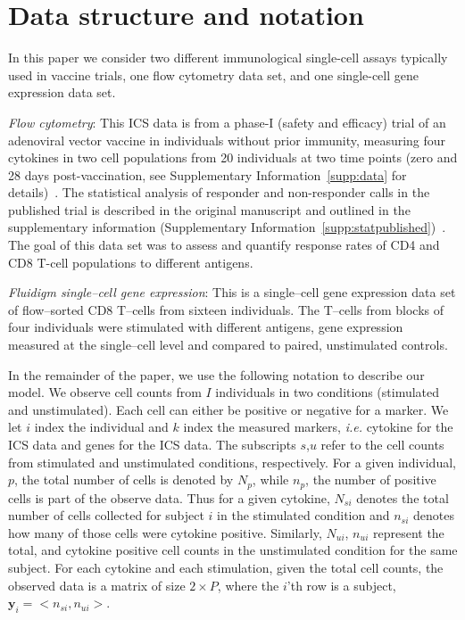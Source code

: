 \documentclass[11pt]{article}
\begin{document}
\section{Data structure and notation} 
In this paper we consider two different immunological single-cell assays typically used in vaccine trials, one flow cytometry data set, and one single-cell gene expression data set.

\textit{Flow cytometry}: This ICS data is from a phase-I (safety and efficacy) trial of an adenoviral vector vaccine in individuals without prior immunity, measuring four cytokines in two cell populations from 20 individuals at two time points (zero and 28 days post-vaccination, see Supplementary Information~\ref{supp:data} for details)~\cite{Peiperl:2010ej}. The statistical analysis of responder and non-responder calls in the published trial is described in the original manuscript and outlined in the supplementary information (Supplementary Information~\ref{supp:statpublished})~\cite{Peiperl:2010ej}. The goal of this data set was to assess and quantify response rates of CD4 and CD8 T-cell populations to different antigens.

\textit{Fluidigm single--cell gene expression}: This is a single--cell gene expression data set of flow--sorted CD8 T--cells from sixteen individuals. The T--cells from blocks of four individuals were stimulated with different antigens, gene expression measured at the single--cell level and compared to paired, unstimulated controls. 

In the remainder of the paper, we use the following notation to describe our model. We observe cell counts from $I$ individuals in two conditions (stimulated and unstimulated). Each cell can either be positive or negative for a marker. We let $i$ index the individual and $k$ index the measured markers, \textit{i.e.} cytokine for the ICS data and genes for the ICS data. The subscripts $s$,$u$ refer to the cell counts from stimulated and unstimulated conditions, respectively. For a given individual, $p$, the total number of cells is denoted by $N_p$, while $n_p$, the number of positive cells is part of the observe data. Thus for a given cytokine, $N_{si}$ denotes the total number of cells collected for subject $i$ in the stimulated condition and $n_{si}$ denotes how many of those cells were cytokine positive. Similarly, $N_{ui}$, $n_{ui}$ represent the total, and cytokine positive cell counts in the unstimulated condition for the same subject. For each cytokine and each stimulation, given the total cell counts, the observed data is a matrix of size $2 \times P$, where the $i$'th row is a subject, $\mathbf{y}_i = <n_{si},n_{ui}>$. 
\end{document}
